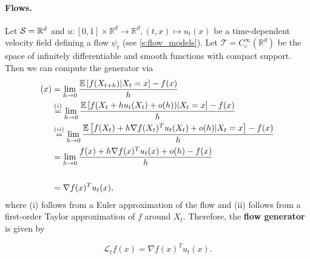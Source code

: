 \documentclass{fairmeta}
\newcommand{\highlight}[1]{{\color{metablue} \textbf{#1}}}
\numberwithin{equation}{section}
\begin{document}
\paragraph{Flows.} Let ${\mathcal{S}}=\mathbb{R}^d$ and $u:[0,1]\times \mathbb{R}^d\to \mathbb{R}^d, (t,x)\mapsto u_t(x)$ be a time-dependent velocity field defining a flow $\psi_t$ (see \cref{s:flow_models}). Let $\mathcal{T}=C_{c}^\infty(\mathbb{R}^d)$ be the space of infinitely differentiable and smooth functions with compact support. Then we can compute the generator via
\begin{align}
    [\gL_t f](x) 
    &=\lim_{h\too 0} \frac{\E\brac{f(X_{t+h})|X_t=x}-f(x)}{h}\\
    &\overset{(i)}{=}\lim_{h\too 0} \frac{\E\brac{f(X_t+hu_t(X_t)+o(h))|X_t=x}-f(x)}{h}\\
    &\overset{(ii)}{=}\lim_{h\too 0} \frac{\E\brac{f(X_t)+h\nabla f(X_t)^Tu_t(X_t)+o(h)|X_t=x}-f(x)}{h}\\
    &= \lim_{h\too 0} \frac{f(x)+h\nabla f(x)^T u_t(x) + o(h)-f(x)}{h}\\
    \label{eq:generator_flow}\\
    &= \nabla f(x)^T u_t(x),
\end{align}
where (i) follows from a Euler approximation of the flow and (ii) follows from a first-order Taylor approximation of $f$ around $X_t$. Therefore, the \highlight{flow generator} is given by
\begin{myframe}
\begin{equation}
\label{eq:flow_generator}
  \mathcal{L}_t f(x) =\nabla f(x)^T u_t(x).
\end{equation}
\end{myframe}
\end{document}
